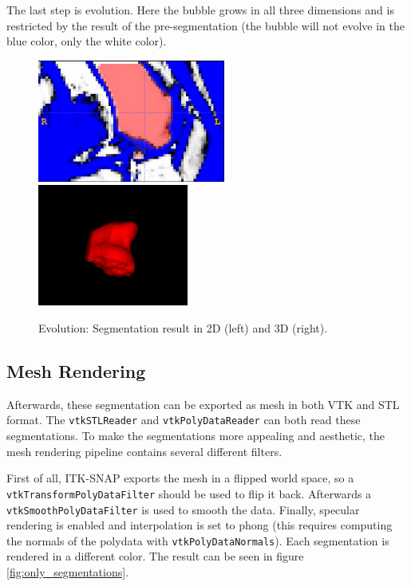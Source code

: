 \documentclass{article}
\begin{document}
The last step is evolution. Here the bubble grows in all three dimensions and is restricted by the result of the pre-segmentation (the bubble will not evolve in the blue color, only the white color).
\begin{figure}[H]
    \centering
    \includegraphics[width=0.55\textwidth]{graphics/evolution_1.png}
    \includegraphics[width=0.44\textwidth]{graphics/evolution_2.png}
    \caption{Evolution: Segmentation result in 2D (left) and 3D (right).}
    \label{fig:evolution}
\end{figure}

\subsection{Mesh Rendering}
Afterwards, these segmentation can be exported as mesh in both VTK and STL format. The \texttt{vtkSTLReader} and \texttt{vtkPolyDataReader} can both read these segmentations. To make the segmentations more appealing and aesthetic, the mesh rendering pipeline contains several different filters.

First of all, ITK-SNAP exports the mesh in a flipped world space, so a \texttt{vtkTransformPolyDataFilter} should be used to flip it back. Afterwards a \texttt{vtkSmoothPolyDataFilter} is used to smooth the data. Finally, specular rendering is enabled and interpolation is set to phong (this requires computing the normals of the polydata with \texttt{vtkPolyDataNormals}). Each segmentation is rendered in a different color. The result can be seen in figure \ref{fig:only_segmentations}.
\end{document}
